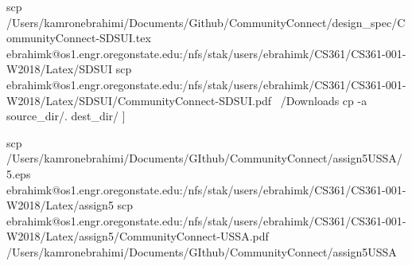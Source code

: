 scp /Users/kamronebrahimi/Documents/Github/CommunityConnect/design_spec/CommunityConnect-SDSUI.tex ebrahimk@os1.engr.oregonstate.edu:/nfs/stak/users/ebrahimk/CS361/CS361-001-W2018/Latex/SDSUI
scp ebrahimk@os1.engr.oregonstate.edu:/nfs/stak/users/ebrahimk/CS361/CS361-001-W2018/Latex/SDSUI/CommunityConnect-SDSUI.pdf ~/Downloads
cp -a source_dir/. dest_dir/
]


scp /Users/kamronebrahimi/Documents/GIthub/CommunityConnect/assign5USSA/5.eps ebrahimk@os1.engr.oregonstate.edu:/nfs/stak/users/ebrahimk/CS361/CS361-001-W2018/Latex/assign5
scp ebrahimk@os1.engr.oregonstate.edu:/nfs/stak/users/ebrahimk/CS361/CS361-001-W2018/Latex/assign5/CommunityConnect-USSA.pdf /Users/kamronebrahimi/Documents/GIthub/CommunityConnect/assign5USSA
